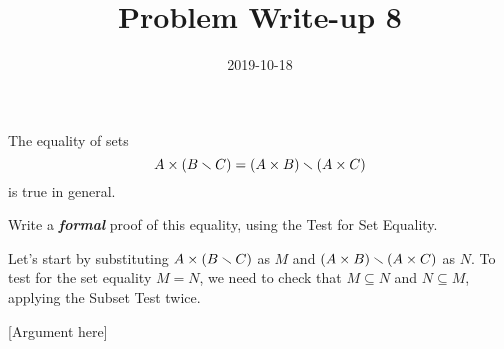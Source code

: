 \documentclass[a4paper,12pt]{article}
\title{Problem Write-up 8}
\date{2019-10-18}
\begin{document}
	\begin{problem}
		The equality of sets \[A \times (B \smallsetminus C) = (A \times B) \smallsetminus (A \times C)\] is true in general.
		
		Write a \textbf{\textit{formal}} proof of this equality, using the Test for Set Equality.	
	\end{problem}
	\begin{answer}
		Let's start by substituting \(A \times (B \smallsetminus C)\) as \(M\) and \((A \times B) \smallsetminus (A \times C)\) as \(N\). To test for the set equality \(M = N\), we need to check that \(M \subseteq N\) and \(N \subseteq M\), applying the Subset Test twice. 

		[Argument here]
	\end{answer}
\end{document}
